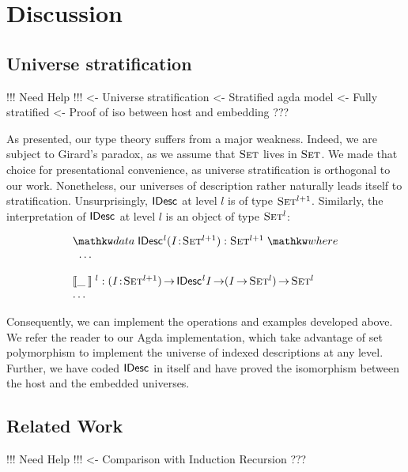 \section{Discussion}
\label{sec:discussion}

\subsection{Universe stratification}

\begin{wstructure}
!!! Need Help !!!
<- Universe stratification
    <- Stratified agda model
        <- Fully stratified
        <- Proof of iso between host and embedding
    ???
\end{wstructure}

As presented, our type theory suffers from a major weakness. Indeed,
we are subject to Girard's paradox, as we assume that $\Set$ lives in
$\Set$. We made that choice for presentational convenience, as
universe stratification is orthogonal to our work. Nonetheless, our
universes of description rather naturally leads itself to
stratification. Unsurprisingly, $\IDesc{\!}$ at level $l$ is of type
$\Set^{\blue{l+1}}$. Similarly, the interpretation of $\IDesc{\!}$ at
level $l$ is an object of type $\Set^{\blue{l}}$:

\[\stk{
\data \IDesc{\!}^{\blue{l}} (\Bhab{\V{I}}{\Set^{\blue{l+1}}}) : \Set^{\blue{l+1}} \where \\
\;\;\ldots \\
\\
\idescop{\_\:}{}{}^{\blue{l}} : \PI{\V{I}}{\Set^{\blue{l+1}}} \IDesc{{\!}^{\blue{l}}\V{I}} \To (\V{I} \To \Set^{\blue{l}}) \To \Set^{\blue{l}}    \\
\ldots
}\]

Consequently, we can implement the operations and examples developed
above. We refer the reader to our Agda implementation, which take
advantage of set polymorphism to implement the universe of indexed
descriptions at any level. Further, we have coded $\IDesc{\!}$ in
itself and have proved the isomorphism between the host and the
embedded universes.

\subsection{Related Work}

\begin{structure}
!!! Need Help !!!
<- Comparison with Induction Recursion
    ???
\end{structure}


